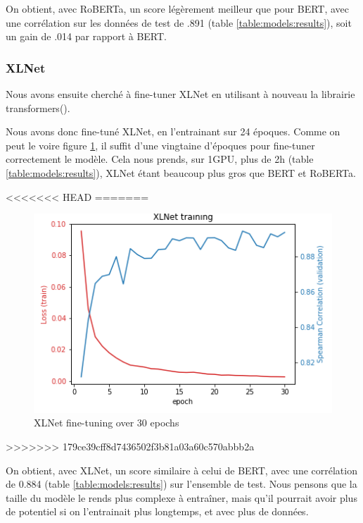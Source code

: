 \documentclass[11pt,a4paper, french]{article}
\begin{document}
On obtient, avec RoBERTa, un score légèrement meilleur que pour BERT, avec une corrélation sur les données de test de .891 (table \ref{table:models:results}), soit un gain de .014 par rapport à BERT.

%
\subsubsection{XLNet}

Nous avons ensuite cherché à fine-tuner XLNet en utilisant à nouveau la librairie transformers(\cite{huggingface}).

Nous avons donc fine-tuné XLNet, en l'entrainant sur 24 époques. Comme on peut le voire figure \ref{fig:XLNet:finetunning}, il suffit d'une vingtaine d'époques pour fine-tuner correctement le modèle. Cela nous prends, sur 1GPU, plus de 2h (table \ref{table:models:results}), XLNet étant beaucoup plus gros que BERT et RoBERTa.

<<<<<<< HEAD
=======
\begin{figure}
  \includegraphics[width=\linewidth]{resources/xlnet-training.png}
  \caption{XLNet fine-tuning over 30 epochs}
  \label{fig:XLNet:finetunning}
\end{figure}
>>>>>>> 179ce39cff8d7436502f3b81a03a60c570abbb2a

On obtient, avec XLNet, un score similaire à celui de BERT, avec une corrélation de 0.884 (table \ref{table:models:results}) sur l'ensemble de test. Nous pensons que la taille du modèle le rends plus complexe à entraîner, mais qu'il pourrait avoir plus de potentiel si on l'entrainait plus longtemps, et avec plus de données.
\end{document}
